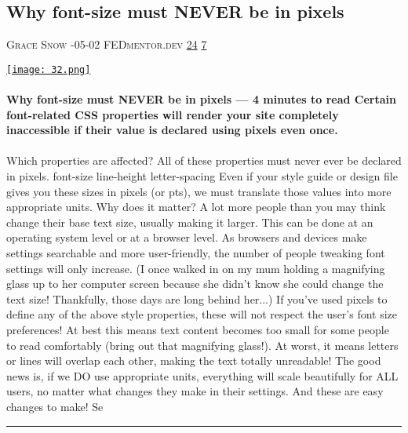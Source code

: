 \documentclass[10pt,a4paper]{article}
\begin{document}
\begin{multicols*}{2}
\begin{minipage}{\linewidth}
\subsection{Why font-size must NEVER be in pixels}
\textsc{\footnotesize
{\scriptsize\faUser}\space 
Grace Snow 
{\scriptsize\faCalendar}-05-02 
{\scriptsize\faGlobe}\space 
FEDmentor.dev 
{\scriptsize\faThumbsOUp}\space 
\href{http://news.ycombinator.com/item?id=37124019\&utm\_term=comment}{24} 
{\scriptsize\faComments}\space 
\href{http://news.ycombinator.com/item?id=37124019\&utm\_term=comment}{7} 
}
\par\medskip\noindent
\href{https://FEDmentor.dev/posts/font-size-px/?utm\_source=hackernewsletter\&utm\_medium=email\&utm\_term=design}{
    \texttt{[image: 32.png]}
}
\end{minipage}
\paragraph{}
\textbf{Why font-size must NEVER be in pixels
— 4 minutes to read
Certain font-related CSS properties will render your site completely inaccessible if their value is declared using pixels even once.}
\paragraph{}

Which properties are affected?
All of these properties must never ever be declared in pixels.
font-size
line-height
letter-spacing
Even if your style guide or design file gives you these sizes in pixels (or pts), we must translate those values into more appropriate units.
Why does it matter?
A lot more people than you may think change their base text size, usually making it larger. This can be done at an operating system level or at a browser level.
As browsers and devices make settings searchable and more user-friendly, the number of people tweaking font settings will only increase. (I once walked in on my mum holding a magnifying glass up to her computer screen because she didn't know she could change the text size!  Thankfully, those days are long behind her...)
If you've used pixels to define any of the above style properties, these will not respect the user's font size preferences!
At best this means text content becomes too small for some people to read comfortably (bring out that magnifying glass!). At worst, it means letters or lines will overlap each other, making the text totally unreadable! 
The good news is, if we DO use appropriate units, everything will scale beautifully for ALL users, no matter what changes they make in their settings. And these are easy changes to make!
Se
\par\noindent\textcolor{red}{\rule{\linewidth}{0.2mm}}
\vfill
\null
\noindent\begin{minipage}{\linewidth}

\end{minipage}
\end{multicols*}
\end{document}
